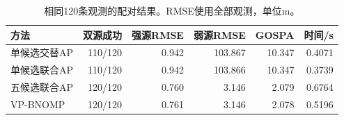 \begin{table}[pos=htbp]\centering\small
\caption{相同120条观测的配对结果。RMSE使用全部观测，单位m。}\label{tab:paired}
\begin{tabular}{@{}lrrrrr@{}}\toprule
方法 & 双源成功 & 强源RMSE & 弱源RMSE & GOSPA & 时间/s\\\midrule
单候选交替AP & 110/120 & 0.942 & 103.867 & 10.347 & 0.4071\\
单候选联合AP & 110/120 & 0.942 & 103.866 & 10.347 & 0.3739\\
五候选联合AP & 120/120 & 0.760 & 3.146 & 2.079 & 0.6764\\
VP-BNOMP & 120/120 & 0.761 & 3.146 & 2.078 & 0.5196\\
\bottomrule\end{tabular}\end{table}
